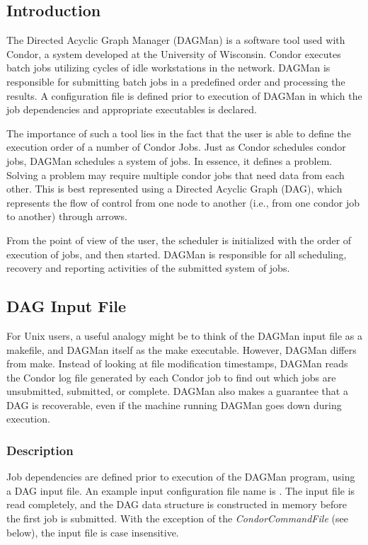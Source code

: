 \subsection{Introduction}

The Directed Acyclic Graph Manager (DAGMan) is a software tool used with
Condor, a system developed at the University of Wisconsin. Condor executes
batch jobs utilizing cycles of idle workstations in the network. DAGMan is
responsible for submitting batch jobs in a predefined order and processing the
results. A configuration file is defined prior to execution of DAGMan in which
the job dependencies and appropriate executables is declared.

The importance of such a tool lies in the fact that the user is able to define
the execution order of a number of Condor Jobs. Just as Condor schedules
condor jobs, DAGMan schedules a system of jobs. In essence, it defines a
problem. Solving a problem may require multiple condor jobs that need data
from each other. This is best represented using a Directed Acyclic Graph
(DAG), which represents the flow of control from one node to another (i.e.,
from one condor job to another) through arrows.

From the point of view of the user, the scheduler is initialized with the
order of execution of jobs, and then started. DAGMan is responsible for all
scheduling, recovery and reporting activities of the submitted system of jobs.

\subsection{DAG Input File}

For Unix users, a useful analogy might be to think of the DAGMan input file as
a makefile, and DAGMan itself as the make executable.  However, DAGMan differs
from make.  Instead of looking at file modification timestamps, DAGMan reads
the Condor log file generated by each Condor job to find out which jobs are
unsubmitted, submitted, or complete.  DAGMan also makes a guarantee that a DAG
is recoverable, even if the machine running DAGMan goes down during execution.

\subsubsection{Description}

Job dependencies are defined prior to execution of the DAGMan program, using a
DAG input file.  An example input configuration file name is .
The input file is read completely, and the DAG data structure is constructed
in memory before the first job is submitted.  With the exception of the
\textit{CondorCommandFile} (see below), the input file is case insensitive.

